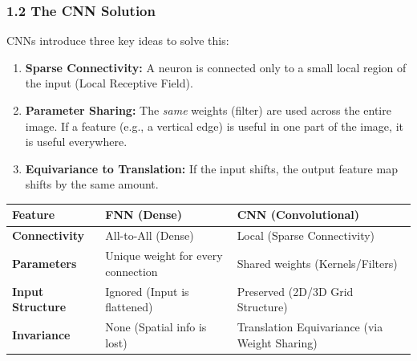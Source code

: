 \documentclass[
  italian,
  11pt,
]{article}
\newcounter{none} %
\begin{document}
\subsubsection{1.2 The CNN Solution}\label{the-cnn-solution}

CNNs introduce three key ideas to solve this:

\begin{enumerate}
\def\labelenumi{\arabic{enumi}.}
\item
  \textbf{Sparse Connectivity:} A neuron is connected only to a small
  local region of the input (Local Receptive Field).
\item
  \textbf{Parameter Sharing:} The \emph{same} weights (filter) are used
  across the entire image. If a feature (e.g., a vertical edge) is
  useful in one part of the image, it is useful everywhere.
\item
  \textbf{Equivariance to Translation:} If the input shifts, the output
  feature map shifts by the same amount.
\end{enumerate}

{\def\LTcaptype{none} %
\begin{longtable}[]{@{}
  >{\raggedright\arraybackslash}p{}
  >{\raggedright\arraybackslash}p{}
  >{\raggedright\arraybackslash}p{}@{}}
\toprule\noalign{}
\begin{minipage}[b]{\linewidth}\raggedright
\textbf{Feature}
\end{minipage} & \begin{minipage}[b]{\linewidth}\raggedright
\textbf{FNN (Dense)}
\end{minipage} & \begin{minipage}[b]{\linewidth}\raggedright
\textbf{CNN (Convolutional)}
\end{minipage} \\
\midrule\noalign{}
\endhead
\bottomrule\noalign{}
\endlastfoot
\textbf{Connectivity} & All-to-All (Dense) & Local (Sparse
Connectivity) \\
\textbf{Parameters} & Unique weight for every connection & Shared
weights (Kernels/Filters) \\
\textbf{Input Structure} & Ignored (Input is flattened) & Preserved
(2D/3D Grid Structure) \\
\textbf{Invariance} & None (Spatial info is lost) & Translation
Equivariance (via Weight Sharing) \\
\end{longtable}
}
\end{document}
